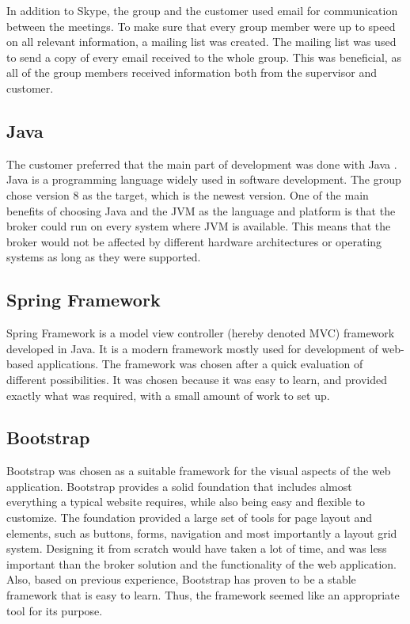 In addition to Skype, the group and the customer used email for communication between the meetings. To make sure that every group member were up to speed on all relevant information, a mailing list was created. The mailing list was used to send a copy of every email received to the whole group. This was beneficial, as all of the group members received information both from the supervisor and customer.

\subsection{Java}
\label{subsec:prestudies-tools-java}

The customer preferred that the main part of development was done with Java \cite{java}. Java is a programming language widely used in software development. The group chose version 8 as the target, which is the newest version. One of the main benefits of choosing Java and the JVM as the language and platform is that the broker could run on every system where JVM is available. This means that the broker would not be affected by different hardware architectures or operating systems as long as they were supported.

\subsection{Spring Framework}
\label{subsec:prestudies-tools-spring_mvc}

Spring Framework \cite{spring-framework} is a model view controller (hereby denoted MVC) framework developed in Java. It is a modern framework mostly used for development of web-based applications. The framework was chosen after a quick evaluation of different possibilities. It was chosen because it was easy to learn, and provided exactly what was required, with a small amount of work to set up.

\subsection{Bootstrap}
\label{subsec:prestudies-tools-bootstrap}

Bootstrap \cite{bootstrap} was chosen as a suitable framework for the visual aspects of the web application. Bootstrap provides a solid foundation that includes almost everything a typical website requires, while also being easy and flexible to customize. The foundation provided a large set of tools for page layout and elements, such as buttons, forms, navigation and most importantly a layout grid system. Designing it from scratch would have taken a lot of time, and was less important than the broker solution and the functionality of the web application. Also, based on previous experience, Bootstrap has proven to be a stable framework that is easy to learn. Thus, the framework seemed like an appropriate tool for its purpose.

